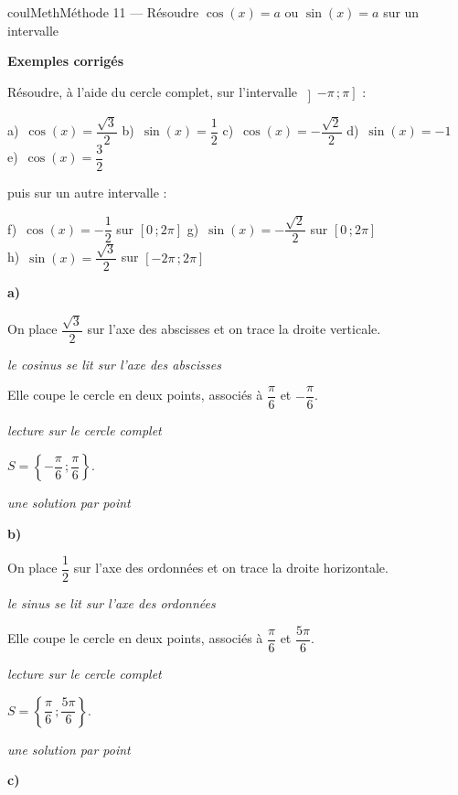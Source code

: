 \documentclass[11pt,a4paper]{article}
\makeatletter
\newcommand{\lycee@intff}[2]{\left[#1\,;#2\right]}
\newcommand{\lycee@intof}[2]{\left]#1\,;#2\right]}
\newcommand{\lycee@ens}[1]{\left\{#1\right\}}
\providecommand{\intff}{\lycee@intff}%
\providecommand{\intof}{\lycee@intof}%
\providecommand{\ens}{\lycee@ens}}
\newcounter{lycee@signet}
\newcommand{\signet}[3][]{\stepcounter{lycee@signet}%
  \edef\lycee@dest{\if\relax\detokenize{#1}\relax
    signet.\arabic{lycee@signet}\else#1\fi}%
  \hypertarget{\lycee@dest}{}\bookmark[level=#2,dest=\lycee@dest]{#3}}
\newcommand{\res}[1]{#1}
\newcounter{methode}
\newenvironment{methodebox}[1][Méthode]{\stepcounter{methode}%
  \begin{boitecours}[phantom={\signet[methode-\arabic{methode}]{2}{#1}}]{coulMeth}{#1}}%
  {\end{boitecours}}
\newcommand{\etape}[1]{\par\smallskip\textbf{\color{coulMeth}#1}\par\nobreak\smallskip}
\newcommand{\explique}[2]{\par\smallskip\noindent
  \begin{minipage}[t]{0.57\linewidth}\raggedright #1\end{minipage}\hfill
  \begin{minipage}[t]{0.40\linewidth}\raggedright\leavevmode
    {\small\itshape\color{black!60}#2}\end{minipage}\par}
\newcommand{\cas}[1]{\par\smallskip\noindent\textbf{\color{coulExo}#1}\vadjust{\nobreak}}
\newenvironment{correction}{\par}{\par}
\newcommand{\etapeexemples}{\etape{Exemples corrigés}}
\makeatother
\begin{document}
\begin{methodebox}[Méthode 11 --- Résoudre $\cos(x)=a$ ou $\sin(x)=a$ sur un intervalle]
\etapeexemples
Résoudre, à l'aide du cercle complet, sur l'intervalle $\intof{-\pi}{\pi}$ :
\begin{center}
a)~$\cos(x)=\dfrac{\sqrt{3}}{2}$ \qquad b)~$\sin(x)=\dfrac{1}{2}$ \qquad
c)~$\cos(x)=-\dfrac{\sqrt{2}}{2}$ \qquad d)~$\sin(x)=-1$ \qquad e)~$\cos(x)=\dfrac{3}{2}$
\end{center}
puis sur un autre intervalle :
\begin{center}
f)~$\cos(x)=-\dfrac{1}{2}$ sur $\intff{0}{2\pi}$ \qquad
g)~$\sin(x)=-\dfrac{\sqrt{2}}{2}$ sur $\intff{0}{2\pi}$\\[4pt]
h)~$\sin(x)=\dfrac{\sqrt{3}}{2}$ sur $\intff{-2\pi}{2\pi}$
\end{center}
\begin{correction}
\cas{a)}\par\nopagebreak
\begin{minipage}[c]{0.68\linewidth}\raggedright
\explique{On place $\dfrac{\sqrt{3}}{2}$ sur l'axe des abscisses et on trace la droite verticale.}{le cosinus se lit sur l'axe des abscisses}
\explique{Elle coupe le cercle en deux points, associés à $\dfrac{\pi}{6}$ et $-\dfrac{\pi}{6}$.}{lecture sur le cercle complet}
\explique{$S=\res{\ens{-\dfrac{\pi}{6}\,;\dfrac{\pi}{6}}}$.}{une solution par point}
\end{minipage}\hfill
\begin{minipage}[c]{0.28\linewidth}\centering
{}
\end{minipage}
\cas{b)}\par\nopagebreak
\begin{minipage}[c]{0.68\linewidth}\raggedright
\explique{On place $\dfrac{1}{2}$ sur l'axe des ordonnées et on trace la droite horizontale.}{le sinus se lit sur l'axe des ordonnées}
\explique{Elle coupe le cercle en deux points, associés à $\dfrac{\pi}{6}$ et $\dfrac{5\pi}{6}$.}{lecture sur le cercle complet}
\explique{$S=\res{\ens{\dfrac{\pi}{6}\,;\dfrac{5\pi}{6}}}$.}{une solution par point}
\end{minipage}\hfill
\begin{minipage}[c]{0.28\linewidth}\centering
{}
\end{minipage}
\cas{c)}\par\nopagebreak
\begin{minipage}[c]{0.68\linewidth}\raggedright

\end{minipage}
\end{correction}
\end{methodebox}
\end{document}
